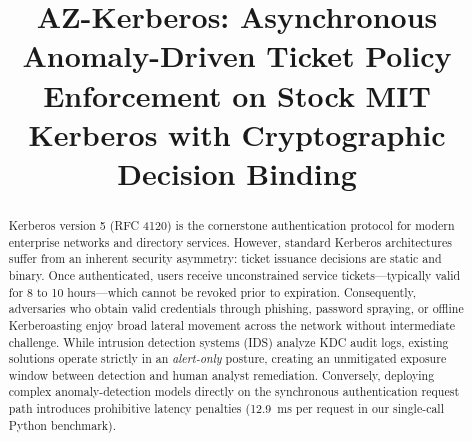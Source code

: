 \documentclass[conference]{IEEEtran}
\begin{document}
\title{AZ-Kerberos: Asynchronous Anomaly-Driven Ticket Policy Enforcement on Stock MIT Kerberos with Cryptographic Decision Binding}

\author{
}

\maketitle

\begin{abstract}
Kerberos version 5 (RFC 4120) is the cornerstone authentication protocol for modern enterprise networks and directory services. However, standard Kerberos architectures suffer from an inherent security asymmetry: ticket issuance decisions are static and binary. Once authenticated, users receive unconstrained service tickets---typically valid for 8 to 10 hours---which cannot be revoked prior to expiration. Consequently, adversaries who obtain valid credentials through phishing, password spraying, or offline Kerberoasting enjoy broad lateral movement across the network without intermediate challenge. While intrusion detection systems (IDS) analyze KDC audit logs, existing solutions operate strictly in an \textit{alert-only} posture, creating an unmitigated exposure window between detection and human analyst remediation. Conversely, deploying complex anomaly-detection models directly on the synchronous authentication request path introduces prohibitive latency penalties (12.9~ms per request in our single-call Python benchmark).


\end{abstract}
\end{document}
